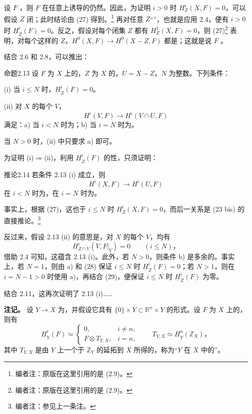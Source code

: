 设 $F$ ，则 $F$ 在任意上诱导的仍然。因此，为证明 $i>0$ 时 $H_Z^i(X,F)=0$，可以假设 $Z$ 闭；此时结论由 (27) 得到。\footnote{编者注：原版在这里引用的是 (2.9)。}
再对任意 $Z$“”，也就是应用 2.4，便有 $i>0$ 时 $\underline H_Z^i(F)=0$。反之，假设对每个闭集 $Z$ 都有 $H_Z^1(X,F)=0$，则 (27)\footnote{编者注：原版在这里引用的是 (2.9)。} 表明，对每个这样的 $Z$，$H^0(X,F)\to H^0(X-Z,F)$ 都是；这就是说 $F$ 。

结合 2.6 和 2.8，可以推出：
\begin{SGAresult}{命题}{2.13}
设 $F$ 为 $X$ 上的，$Z$ 为 $X$ 的，$U=X-Z$，$N$ 为整数。下列条件：

\textnormal{(i)} 当 $i\le N$ 时，$\underline H_Z^i(F)=0$。

\textnormal{(ii)} 对 $X$ 的每个 $V$，
\[
H^i(V,F)\longrightarrow H^i(V\cap U,F)
\]
满足：a) 当 $i<N$ 时为；b) 当 $i=N$ 时为。

当 $N>0$ 时，(ii) 中只要求 a) 即可。
\end{SGAresult}
为证明 (i)$\Rightarrow$(ii)，利用 $\underline H_Z^i(F)$ 的性，只须证明：
\begin{SGAresult}{推论}{2.14}
若条件 2.13 (i) 成立，则
\[
H^i(X,F)\longrightarrow H^i(U,F)
\]
在 $i<N$ 时为，在 $i=N$ 时为。
\end{SGAresult}
事实上，根据 (27)，这也于 $i\le N$ 时 $H_Z^i(X,F)=0$，而后一关系是 (23 bis) 的直接推论。\footnote{编者注：参见上一条注。}

反过来，假设 2.13 (ii) 的意思是，对 $X$ 的每个 $V$，均有
\[
H_{Z\cap V}^i(V,F|_V)=0\qquad(i\le N)，
\]
借助 2.4 可知，这蕴含 2.13 (i)。此外，若 $N>0$，则条件 b) 是多余的。事实上，若 $N=1$，则由 a) 和 (28) 保证 $i\le N$ 时 $\underline H_Z^i(F)=0$；若 $N>1$，则在 $i=N-1>0$ 时使用 a)，再结合 (29)，便保证 $i\le N$ 时 $\underline H_Z^i(F)$ 为零。

结合 2.11，这再次证明了 2.13 (i)……

\textbf{注记。}
设 $Y\to X$ 为，并假设它具有 $\{0\}\times Y\subset\mathbb R^n\times Y$ 的形式。设 $F$ 为 $X$ 上的，则有
\[
\underline H_Y^i(F)\simeq
\begin{cases}
0,&i\ne n,\\
F\otimes T_{Y,X},&i=n,
\end{cases}
\qquad T_{Y,X}\simeq\underline H_Y^n(\mathbb Z_X)，\tag{30}
\]
其中 $T_{Y,X}$ 是由 $Y$ 上一个于 $\mathbb Z_Y$ 的延拓到 $X$ 所得的，称为“$Y$ 在 $X$ 中的”。

